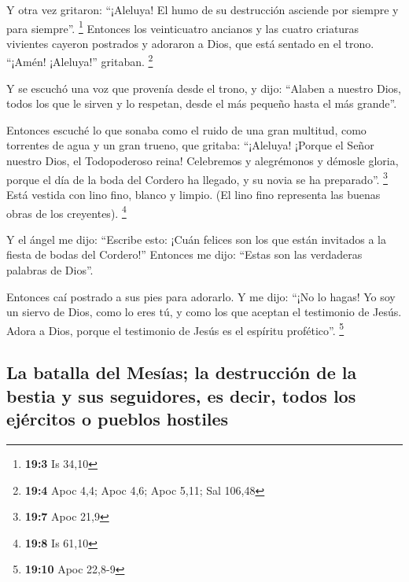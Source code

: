  Y otra vez gritaron: ``¡Aleluya! El humo de su
destrucción asciende por siempre y para siempre''. \footnote{\textbf{19:3}
  Is 34,10}  Entonces los veinticuatro ancianos y las
cuatro criaturas vivientes cayeron postrados y adoraron a Dios, que está
sentado en el trono. ``¡Amén! ¡Aleluya!'' gritaban. \footnote{\textbf{19:4}
  Apoc 4,4; Apoc 4,6; Apoc 5,11; Sal 106,48}

 Y se escuchó una voz que provenía desde el trono, y dijo:
``Alaben a nuestro Dios, todos los que le sirven y lo respetan, desde el
más pequeño hasta el más grande''.

 Entonces escuché lo que sonaba como el ruido de una gran
multitud, como torrentes de agua y un gran trueno, que gritaba:
``¡Aleluya! ¡Porque el Señor nuestro Dios, el Todopoderoso reina!
 Celebremos y alegrémonos y démosle gloria, porque el día
de la boda del Cordero ha llegado, y su novia se ha preparado''.
\footnote{\textbf{19:7} Apoc 21,9}  Está vestida con lino
fino, blanco y limpio. (El lino fino representa las buenas obras de los
creyentes). \footnote{\textbf{19:8} Is 61,10}

 Y el ángel me dijo: ``Escribe esto: ¡Cuán felices son los
que están invitados a la fiesta de bodas del Cordero!'' Entonces me
dijo: ``Estas son las verdaderas palabras de Dios''.

 Entonces caí postrado a sus pies para adorarlo. Y me
dijo: ``¡No lo hagas! Yo soy un siervo de Dios, como lo eres tú, y como
los que aceptan el testimonio de Jesús. Adora a Dios, porque el
testimonio de Jesús es el espíritu profético''. \footnote{\textbf{19:10}
  Apoc 22,8-9}

\hypertarget{la-batalla-del-mesuxedas-la-destrucciuxf3n-de-la-bestia-y-sus-seguidores-es-decir-todos-los-ejuxe9rcitos-o-pueblos-hostiles}{%
\subsection{La batalla del Mesías; la destrucción de la bestia y sus
seguidores, es decir, todos los ejércitos o pueblos
hostiles}\label{la-batalla-del-mesuxedas-la-destrucciuxf3n-de-la-bestia-y-sus-seguidores-es-decir-todos-los-ejuxe9rcitos-o-pueblos-hostiles}}

